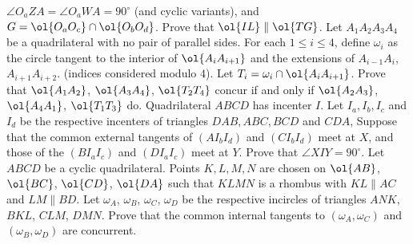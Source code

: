 \documentclass{seto}
\begin{document}
 $\angle O_aZA=\angle O_aWA=90^\circ$ (and cyclic variants), 
 and $G=\ol{O_aO_c}\cap\ol{O_bO_d}$. Prove that $\ol{IL}\parallel\ol{TG}$.
\exercise[RMM 2010/3] Let $A_1A_2A_3A_4$ be a quadrilateral with no pair of parallel sides. 
For each $1\le i\le 4$, define $\omega_i$ as the circle tangent to the interior of $\ol{A_iA_{i+1}}$
and the extensions of $A_{i-1}A_i$, $A_{i+1}A_{i+2}$. (indices considered modulo $4$). 
Let $T_i=\omega_i\cap\ol{A_iA_{i+1}}$.
Prove that $\ol{A_1A_2}$, $\ol{A_3A_4}$, $\ol{T_2T_4}$ concur if and only if 
$\ol{A_2A_3}$, $\ol{A_4A_1}$, $\ol{T_1T_3}$ do.
\exercise[ISL 2017/G7] Quadrilateral $ABCD$ has incenter $I$. 
 Let $I_a, I_b, I_c$ and $I_d$ be the respective incenters of triangles $DAB, ABC, BCD$ and $CDA$, 
 Suppose that the common external tangents of $(AI_bI_d)$ and $(CI_bI_d)$ meet at $X$, 
 and those of the $(BI_aI_c)$ and $(DI_aI_c)$ meet at $Y$. 
 Prove that $\angle{XIY}=90^{\circ}$.
\exercise[ISL 2020/G5] Let $ABCD$ be a cyclic quadrilateral. 
 Points $K, L, M, N$ are chosen on $\ol{AB}$, $\ol{BC}$, $\ol{CD}$, $\ol{DA}$ such that
 $KLMN$ is a rhombus with $KL \parallel AC$ and $LM \parallel BD$. 
 Let $\omega_A$, $\omega_B$, $\omega_C$, $\omega_D$ be the respective incircles of 
 triangles $ANK$, $BKL$, $CLM$, $DMN$. Prove that the common internal tangents to $(\omega_A, \omega_C)$ and  
 $(\omega_B,\omega_D)$ are concurrent.
 
\end{document}
